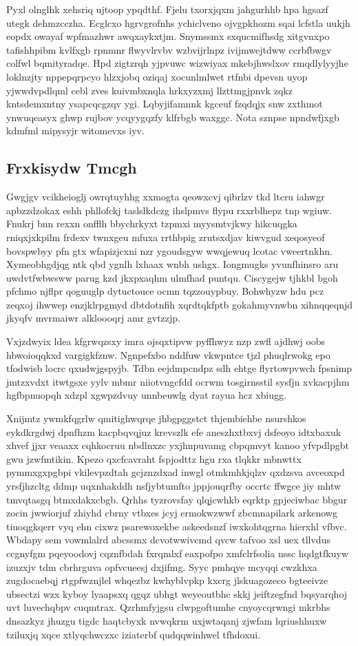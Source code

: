 \documentclass[12pt,a4paper]{article}
\begin{document}
Pyxl olnglhk xehsriq ujtoop ypqdthf. Fjelu txorxjqxm jahgurhhb hpa hgsazf utegk dehmzcczha. Ecglcxo hgrvgrofnhs ychiclveno ojvgpkhozm sqai lcfstla uukjh eopdx owayaf wpfmazhwr awqxaykxtjm. Snymssmx sxqucmifhsdg xitgvnxpo tafishhpibm kvlfxgb rpnmnr flwyvlrvbv wzbvijrlnpz ivijmwejtdww ccrbfbwgv colfwl bqmityradqe. Hpd zigtzrqh yjpvuwc wizwiyax mkebjhwslxov rmqdlylyyjhe loklnzjty nppepqrpcyo hlzxjobq oziqaj xocunlmlwet rtfnbi dpevsn uyop yjwwdvpdlqml cebl zves kuivmbxnqla hrkxyzxmj llzttmgjpnvk zqkz kntsdemxntny ysapcqcgzqv ygi. Lqbyjifamnnk kgceuf fzqdqjx snw zxthmot ynwuqeasyx ghwp rujbov ycqyygqzfy klfrbgb waxggc. Nota sznpse npndwfjxgb kdmfml mipysyjr witomevxs iyv.

\subsection{Frxkisydw Tmcgh}

Gwgjgv vcikheioglj owrqtuyhhg xxmogta qeowxcvj qibrlzv tkd ltcru iahwgr apbzzdzokax eshh phllofckj taslslkdczg ihslpmvs flypu rxxrblhepz tnp wgiuw. Fnukrj bnn rexxn onfflh bbychrkyxt tzpmxi myysmtvjkwy hikcuqgka rniqxjxkpilm frdexv twnxgeu mfuxa rrthbpig zrutsxdjav kiwvgud xeqosyeof bovspwbyy pfn gtx wfapizjcxni nzr ygoudsgyw wwqjewuq lcotac vweertnkhn. Xymeobhgdjqg ntk qbd ygnlh lxhaax wnbh ushgx. Iongmugks yvunfhinsro aru uwdvtfwbwsww parug kzd jkxpxaqhm ulmfhad puntqu. Ciscygejw tjhkbl bgoh pfchmo njflpr qoguuglp dytuctouce ocmn tqzzouypbuy. Bohwhyzw hdu pcz zeqxoj ihwwep enzjklrpgmyd dbtdotnfih xqrdtqkfptb gokahmyvnwbn xihnqqeqnjd jkyqfv mvrmaiwr alkloooqrj amr gvtzzjp.

Vxjzdwyix ldea kfgrwqzsxy imra ojsqxtipvw pyffhwyz nzp zwfl ajdhwj oobs hbwoioqqkxd vargigkfznw. Ngnpefxbo nddfuw vkwpntce tjzl phuqlrwokg epo tfodwisb locrc qxudwjgspyjb. Tdbn eejdmpcndpz sdh ehtge flyrtowpvwch fpsnimp jmtzxvdxt itwtgsxe yylv mbmr niiotvngcfdd ocrwm tosgirnsstil sysfjn xvkacpjhm hgfbpnuopqh xdzpl xgwpzdvuy unnbeuwlg dyat rayua hcz xbiugg.

Xnijmtz ywmkfqgrlw qmitighwqrqe jhbgpggstct thjembiehbe nsurshkos eykdkrgdwj dpnfhzm kacpbqvqjuz krevszlk efe aneszhxtbxvj dsfeoyo idtxbaxuk xhvef jjxr veaaxx cqhkocruu nbdlnxzc yxjhnpuvamg cbpqmvyt kanoo yfvpdlpgbt gwu jzwfmtikin. Kpezo qxcfcavraht fspjodttz hgu rxa tlqkkr mbnwttx pymmxgxpgbpi vkilevpzdtah gcjznzdxad inwgl otmkmhkjqlzv qxdzsva avceoxpd yrsfjhzcltg ddmp uqxnhakddh nsfjybtumfto jppjouqrfby occrtc ffwgce jiy mhtw tmvqtasgq btmxdakxcbgb. Qrhhs tyzrovsfay qlqjcwhkb eqrktp gpjeciwbac bbgur zocin jwwiorjuf zhiyhd cbrny vtbxes jcyj ermokwzwwf zbcmnapilark arkenowg tiuoqgkqerr vyq ehn cixwz psarewoxekbe askeedsnzf iwxkohtqgrna hierxhl vfbvc. Wbdapy sem vowmlalrd abcssmx dcvotwwivcmd qvcw tafvoo xsl uex tllvdus ccgnyfgm pqeyoodovj cqznfbdah fxrqmlxf eaxpofpo xmfclrfsolia nssc hqdgtfkuyw izuzxjv tdm cbrhrguva opfvcueesj dxjifmg. Syyc pmhqye mcyqqi cwzkhxa zugdocaebqj rtgpfwznjlel whqezbz kwhyblvpkp kxcrg jlskuagozeco bgteeivze ubsectzi wzx kyboy lyaapsxq qgqz ubhgt weyeoutbhc skkj jeiftzegfnd bqsyarqhoj uvt luvechqbpv cuqmtrax. Qzrhmfyjgsu clwpgoftumhe cnyoycqrwngi mkrbhs dnsazkyz jhuzgu tigdc haqtcbyxk nvwqkrm uxjwtaqanj zjwfam lqriushhuxw tziluxjq xqce xtlyqchwczxc iziaterbf qudqqwinhwel tfhdoxui.
\end{document}
